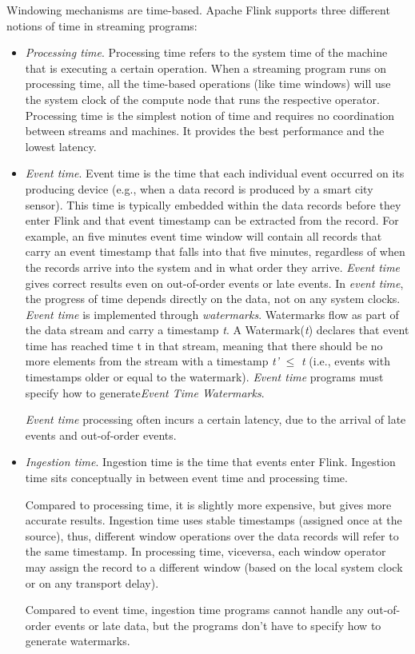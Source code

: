 Windowing mechanisms are time-based. Apache Flink supports three different notions of time in streaming programs:
\begin{itemize}
\item \emph{Processing time}. Processing time refers to the system time of the machine that is executing a certain operation. When a streaming program runs on processing time, all the time-based operations (like time windows) will use the system clock of the compute node that runs the respective operator. Processing time is the simplest notion of time and requires no coordination between streams and machines. It provides the best performance and the lowest latency. 
\item \emph{Event time}. Event time is the time that each individual event occurred on its producing device (e.g., when a data record is produced by a smart city sensor). This time is typically embedded within the data records before they enter Flink and that event timestamp can be extracted from the record. For example, an five minutes event time window will contain all records that carry an event timestamp that falls into that five minutes, regardless of when the records arrive into the system and in what order they arrive. \emph{Event time} gives correct results even on out-of-order events or  late events. In \emph{event time}, the progress of time depends directly on the data, not on any system clocks. \emph{Event time} is implemented through \emph{watermarks}. Watermarks flow as part of the data stream and carry a timestamp \emph{t}. A Watermark(\emph{t}) declares that event time has reached time t in that stream, meaning that there should be no more elements from the stream with a timestamp \emph{t'} $\leq$ \emph{t} (i.e., events with timestamps older or equal to the watermark). \emph{Event time} programs must specify how to generate\emph{Event Time Watermarks}.

\emph{Event time} processing often incurs a certain latency, due to the arrival of late events and out-of-order events. 
\item \emph{Ingestion time}. Ingestion time is the time that events enter Flink. Ingestion time sits conceptually in between event time and processing time. 

Compared to processing time, it is slightly more expensive, but gives more accurate results. Ingestion time uses stable timestamps (assigned once at the source), thus, different window operations over the data records will refer to the same timestamp. In processing time, viceversa, each window operator may assign the record to a different window (based on the local system clock or on any transport delay).

Compared to event time, ingestion time programs cannot handle any out-of-order events or late data, but the programs don’t have to specify how to generate watermarks.
\end{itemize}
